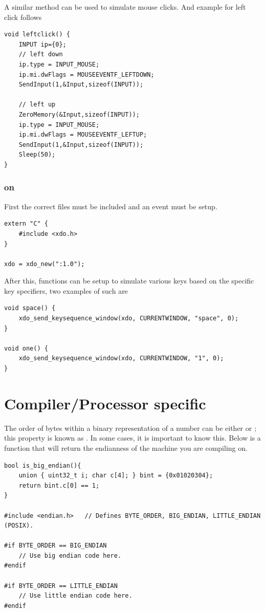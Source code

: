 A similar method can be used to simulate mouse clicks. And example for left click follows
\begin{lstlisting}
void leftclick() {
	INPUT ip={0};
	// left down
	ip.type = INPUT_MOUSE;
	ip.mi.dwFlags = MOUSEEVENTF_LEFTDOWN;
	SendInput(1,&Input,sizeof(INPUT));
	
	// left up
	ZeroMemory(&Input,sizeof(INPUT));
	ip.type = INPUT_MOUSE;
	ip.mi.dwFlags = MOUSEEVENTF_LEFTUP;
	SendInput(1,&Input,sizeof(INPUT));
	Sleep(50);
}
\end{lstlisting}










\subsubsection{ on }

First the correct files must be included and an event must be setup.
\begin{lstlisting}
extern "C" {
	#include <xdo.h>
}

xdo = xdo_new(":1.0");
\end{lstlisting}

After this, functions can be setup to simulate various keys based on the specific key specifiers, two examples of such are
\begin{lstlisting}
void space() {
    xdo_send_keysequence_window(xdo, CURRENTWINDOW, "space", 0);
}

void one() {
	xdo_send_keysequence_window(xdo, CURRENTWINDOW, "1", 0);
}
\end{lstlisting}











\section{Compiler/Processor specific}

The order of bytes within a binary representation of a number can be either  or ; this property is known as . In some cases, it is important to know this. Below is a function that will return the endianness of the machine you are compiling on.
\begin{lstlisting}
bool is_big_endian(){
	union { uint32_t i; char c[4]; } bint = {0x01020304};
	return bint.c[0] == 1;
}

#include <endian.h>   // Defines BYTE_ORDER, BIG_ENDIAN, LITTLE_ENDIAN (POSIX).

#if BYTE_ORDER == BIG_ENDIAN
	// Use big endian code here.
#endif

#if BYTE_ORDER == LITTLE_ENDIAN
	// Use little endian code here.
#endif
\end{lstlisting}

